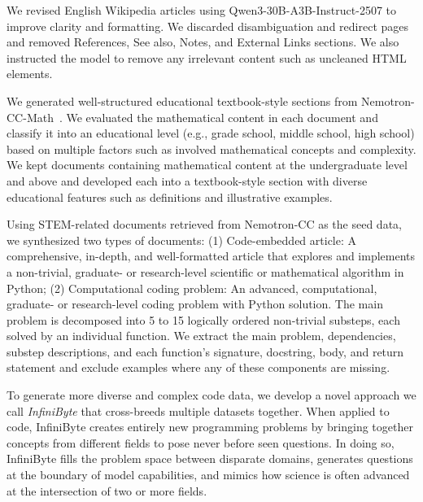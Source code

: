 We revised English Wikipedia articles using Qwen3-30B-A3B-Instruct-2507 to improve clarity and formatting. We discarded disambiguation and redirect pages and removed References, See also, Notes, and External Links sections. We also instructed the model to remove any irrelevant content such as uncleaned HTML elements.

We generated well-structured educational textbook-style sections from Nemotron-CC-Math~\citep{karimi2025nemotronccmath}.
We evaluated the mathematical content in each document and classify it into an educational level (e.g., grade school, middle school, high school) based on multiple factors such as involved mathematical concepts and complexity.
We kept documents containing mathematical content at the undergraduate level and above and developed each into a textbook-style section with diverse educational features such as definitions and illustrative examples.

 Using STEM-related documents retrieved from Nemotron-CC as the seed data, we synthesized two types of documents:
(1) Code-embedded article: A comprehensive, in-depth, and well-formatted article that explores and implements a non-trivial, graduate- or research-level scientific or mathematical algorithm in Python;
(2) Computational coding problem: An advanced, computational, graduate- or research-level coding problem with Python solution. The main problem is decomposed into 5 to 15 logically ordered non-trivial substeps, each solved by an individual function. We extract the main problem, dependencies, substep descriptions, and each function's signature, docstring, body, and return statement and exclude examples where any of these components are missing.

To generate more diverse and complex code data, we develop a novel approach we call \textit{InfiniByte} that cross-breeds multiple datasets together. When applied to code, InfiniByte creates entirely new programming problems by bringing together concepts from different fields to pose never before seen questions. In doing so, InfiniByte fills the problem space between disparate domains, generates questions at the boundary of model capabilities, and mimics how science is often advanced at the intersection of two or more fields.

